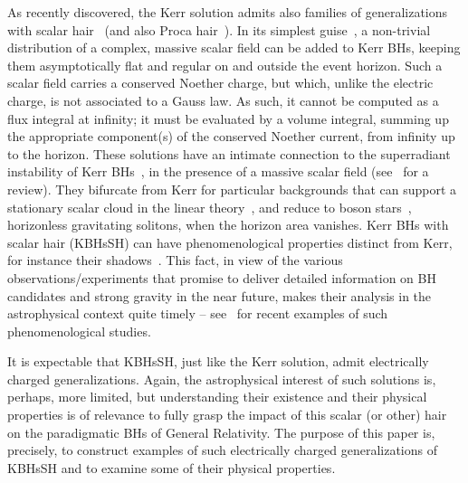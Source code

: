 As recently discovered, the Kerr solution admits also families of generalizations with scalar hair~\cite{Herdeiro:2014goa,Herdeiro:2015gia,Kleihaus:2015iea,Herdeiro:2015tia,Chodosh:2015oma} (and also Proca hair~\cite{Herdeiro:2016tmi}). In its simplest guise~\cite{Herdeiro:2014goa,Herdeiro:2015gia}, a non-trivial distribution of a complex, massive scalar field can be added to Kerr BHs, keeping them asymptotically flat and regular on and outside the event horizon. Such a scalar field carries a conserved Noether charge, but which, unlike the electric charge, is not associated to a Gauss law. As such, it cannot be computed as a flux integral at infinity; it must be evaluated by a volume integral, summing up the appropriate component(s) of the conserved Noether current, from infinity up to the horizon. These solutions have an intimate connection to the superradiant instability of Kerr BHs~\cite{Herdeiro:2014ima}, in the presence of a massive scalar field (see~\cite{Brito:2015oca} for a review). They bifurcate from Kerr for particular backgrounds that can support a stationary scalar cloud in the linear theory~\cite{Hod:2012px,Hod:2013zza,Herdeiro:2014goa,Benone:2014ssa,Hod:2015ota,Hod:2015goa}, and reduce to boson stars~\cite{Schunck:2003kk}, horizonless gravitating solitons, when the horizon area vanishes. Kerr BHs with scalar hair (KBHsSH) can have phenomenological properties distinct from Kerr, for instance their shadows~\cite{Cunha:2015yba}. This fact, in view of the various observations/experiments that promise to deliver detailed information on BH candidates and strong gravity in the near future, makes their analysis in the astrophysical context quite timely -- see~\cite{Vincent:2016sjq,Ni:2016rhz} for recent examples of such phenomenological studies.

\bigskip

It is expectable that KBHsSH, just like the Kerr solution, admit electrically charged generalizations. Again, the astrophysical interest of such solutions is, perhaps, more limited, but understanding their existence and their physical properties is of relevance to fully grasp the impact of this scalar (or other) hair on the paradigmatic BHs of General Relativity. The purpose of this paper is, precisely, to construct examples of such electrically charged generalizations of KBHsSH and to examine some of their physical properties. 

\bigskip

